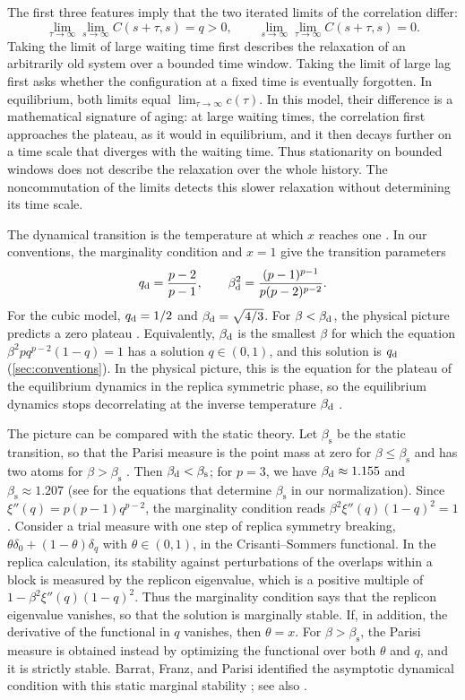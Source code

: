 The first three features imply that the two iterated limits of the correlation differ:
\[
 \lim_{\tau\to\infty}\lim_{s\to\infty}C(s+\tau,s)=q>0,
 \qquad
 \lim_{s\to\infty}\lim_{\tau\to\infty}C(s+\tau,s)=0.
\]
Taking the limit of large waiting time first describes the relaxation of an arbitrarily old system over a bounded time window. Taking the limit of large lag first asks whether the configuration at a fixed time is eventually forgotten. In equilibrium, both limits equal $\lim_{\tau\to\infty}c(\tau)$. In this model, their difference is a mathematical signature of aging: at large waiting times, the correlation first approaches the plateau, as it would in equilibrium, and it then decays further on a time scale that diverges with the waiting time. Thus stationarity on bounded windows does not describe the relaxation over the whole history. The noncommutation of the limits detects this slower relaxation without determining its time scale.

The dynamical transition is the temperature at which $x$ reaches one \cite{ck1993}. In our conventions, the marginality condition and $x=1$ give the transition parameters
\[
 q_{\mathrm d}=\frac{p-2}{p-1},\qquad \beta_{\mathrm d}^2=\frac{(p-1)^{p-1}}{p(p-2)^{p-2}}.
\]
For the cubic model, $q_{\mathrm d}=1/2$ and $\beta_{\mathrm d}=\sqrt{4/3}$. For $\beta<\beta_{\mathrm d}$, the physical picture predicts a zero plateau \cite{ck1993,chs1993}. Equivalently, $\beta_{\mathrm d}$ is the smallest $\beta$ for which the equation $\beta^2pq^{p-2}(1-q)=1$ has a solution $q\in(0,1)$, and this solution is $q_{\mathrm d}$ (\cref{sec:conventions}). In the physical picture, this is the equation for the plateau of the equilibrium dynamics in the replica symmetric phase, so the equilibrium dynamics stops decorrelating at the inverse temperature $\beta_{\mathrm d}$ \cite{chs1993}.

The picture can be compared with the static theory. Let $\beta_{\mathrm s}$ be the static transition, so that the Parisi measure is the point mass at zero for $\beta\le\beta_{\mathrm s}$ and has two atoms for $\beta>\beta_{\mathrm s}$ \cite{auffingerchen2015}. Then $\beta_{\mathrm d}<\beta_{\mathrm s}$; for $p=3$, we have $\beta_{\mathrm d}\approx1.155$ and $\beta_{\mathrm s}\approx1.207$ (see \cite[Theorem~1]{subag2023} for the equations that determine $\beta_{\mathrm s}$ in our normalization). Since $\xi''(q)=p(p-1)q^{p-2}$, the marginality condition reads $\beta^2\xi''(q)(1-q)^2=1$. Consider a trial measure with one step of replica symmetry breaking, $\theta\delta_0+(1-\theta)\delta_q$ with $\theta\in(0,1)$, in the Crisanti--Sommers functional. In the replica calculation, its stability against perturbations of the overlaps within a block is measured by the replicon eigenvalue, which is a positive multiple of $1-\beta^2\xi''(q)(1-q)^2$. Thus the marginality condition says that the replicon eigenvalue vanishes, so that the solution is marginally stable. If, in addition, the derivative of the functional in $q$ vanishes, then $\theta=x$. For $\beta>\beta_{\mathrm s}$, the Parisi measure is obtained instead by optimizing the functional over both $\theta$ and $q$, and it is strictly stable. Barrat, Franz, and Parisi identified the asymptotic dynamical condition with this static marginal stability \cite[Section~IV, Equation~(25)]{bfp1997}; see also \cite[arXiv version~2, Section~15.1]{cugliandolo2004}.


